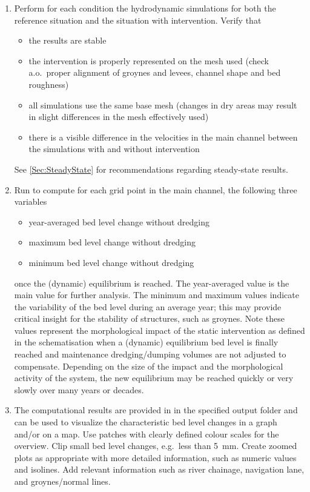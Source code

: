 \begin{enumerate}
\item Perform for each condition the hydrodynamic simulations for both the reference situation and the situation with intervention.
Verify that
\begin{itemize}
\item the \dflowfm results are stable
\item the intervention is properly represented on the mesh used (check a.o.~proper alignment of groynes and levees, channel shape and bed roughness)
\item all simulations use the same base mesh (changes in dry areas may result in slight differences in the mesh effectively used)
\item there is a visible difference in the velocities in the main channel between the simulations with and without intervention
\end{itemize}
See \autoref{Sec:SteadyState} for recommendations regarding steady-state results.

\item Run \dfastmi to compute for each grid point in the main channel, the following three variables

\begin{itemize}
\item year-averaged bed level change  without dredging
\item maximum bed level change  without dredging
\item minimum bed level change  without dredging
\end{itemize}

once the (dynamic) equilibrium is reached. The year-averaged value is the main value for further analysis.
The minimum and maximum values indicate the variability of the bed level during an average year; this may provide critical insight for the stability of structures, such as groynes.
Note these values represent the morphological impact of the static intervention as defined in the \dflowfm schematisation when a (dynamic) equilibrium bed level is finally reached and maintenance dredging/dumping volumes are not adjusted to compensate.
Depending on the size of the impact and the morphological activity of the system, the new equilibrium may be reached quickly or very slowly over many years or decades.

\item The computational results are provided in  in the specified output folder and can be used to visualize the characteristic bed level changes in a graph and/or on a map.
Use patches with clearly defined colour scales for the overview.
Clip small bed level changes, e.g.~less than \SI{5}{\milli\metre}.
Create zoomed plots as appropriate with more detailed information, such as numeric values and isolines.
Add relevant information such as river chainage, navigation lane, and groynes/normal lines.


\end{enumerate}
